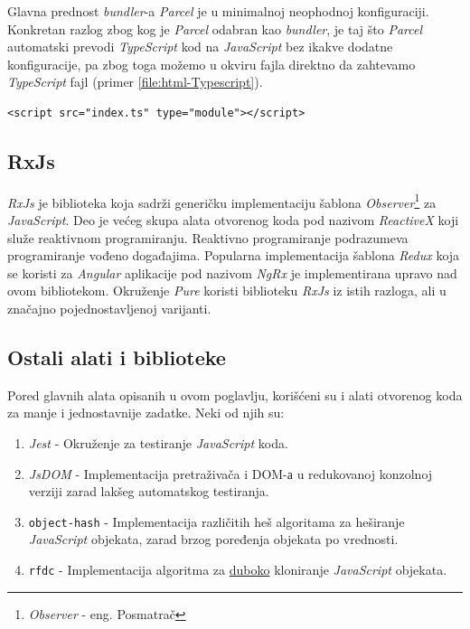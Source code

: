 \documentclass[12pt,oneside]{memoir}
\newcommand{\code}[1]{\colorbox{codegray}{\texttt{\scalebox{0.9}{#1}}}}%
\begin{document}
Glavna prednost \emph{bundler}-a \emph{Parcel} je u minimalnoj neophodnoj konfiguraciji.
Konkretan razlog zbog kog je \emph{Parcel} odabran kao \emph{bundler}, je taj što \emph{Parcel} automatski
prevodi \emph{TypeScript} kod na \emph{JavaScript} bez ikakve dodatne konfiguracije, pa zbog toga možemo u okviru
\code{index.html} fajla direktno da zahtevamo \emph{TypeScript} fajl (primer \ref{file:html-Typescript}).
\begin{lstlisting}[style=htmlStyle,numberstyle=\tiny, caption={Uključivanje \emph{TypeScript} fajla direktno u \code{index.html}}, label=file:html-Typescript]
<script src="index.ts" type="module"></script>
\end{lstlisting}

\subsection{RxJs}
\emph{RxJs} je biblioteka koja sadrži generičku implementaciju šablona \emph{Observer}\footnote{\emph{Observer} - eng. Posmatrač} za \emph{JavaScript}.
Deo je većeg skupa alata otvorenog koda pod nazivom \emph{ReactiveX} koji služe reaktivnom programiranju.
Reaktivno programiranje podrazumeva programiranje vođeno događajima. Popularna implementacija šablona \emph{Redux} koja se koristi za \emph{Angular} aplikacije
pod nazivom \emph{NgRx} je implementirana upravo nad ovom bibliotekom. Okruženje \emph{Pure} koristi
biblioteku \emph{RxJs} iz istih razloga, ali u značajno pojednostavljenoj varijanti.
\subsection{Ostali alati i biblioteke}
Pored glavnih alata opisanih u ovom poglavlju, korišćeni su i alati otvorenog koda za manje i jednostavnije zadatke.
Neki od njih su:
\begin{enumerate}
  \item \emph{Jest} - Okruženje za testiranje \emph{JavaScript} koda.
  \item \emph{JsDOM} - Implementacija pretraživača i DOM-а u redukovanoj konzolnoj verziji zarad lakšeg automatskog testiranja.
  \item \texttt{object-hash} - Implementacija različitih heš algoritama za heširanje
  \emph{JavaScript} objekata, zarad brzog poređenja objekata po vrednosti.
  \item \texttt{rfdc} - Implementacija algoritma za \underline{duboko} kloniranje \emph{JavaScript} objekata. 
\end{enumerate}
\end{document}
